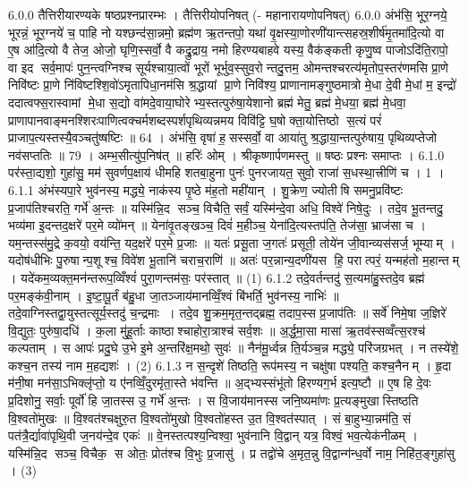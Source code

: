 \setcounter{anuvakam}{0}
6.0.0
तैत्तिरीयारण्यके षष्ठप्रश्नप्रारम्भः । तैत्तिरीयोपनिषत् (- महानारायणोपनिषत्)
6.0.0
अंभ॑सि॒ भूर॒ग्नये॒ भूरन्नं॒ भूर॒ग्नये॑ च॒ पाहि नो यश्छन्द॑सा॒न्नमो॒ ब्रह्म॑ण ऋ॒तन्तपो॒ यथा॑ वृ॒क्षस्या॒णोरणी॑यान्त्सहस्र॒शीर्\mbox{}ष॑मृ॒तमा॑दि॒त्यो वा ए॒ष आ॑दि॒त्यो वै तेज॒ ओजो॒ घृणि॒स्सर्वो॒ वै कद्रु॒द्राय॒ नमो हिरण्यबाहवे यस्य॒ वैक॑ङ्कती कृणु॒ष्व पाजोऽदि॑ति॒रापो॒ वा इद सर्व॒मापः॑ पुन॒न्त्वग्निश्च सूर्यश्चाया॒त्वों भूरों भूर्भुव॒स्सुव॒रोन्तदु॒त्तम॒ ओमन्तश्चरत्य॑मृतोप॒स्तर॑णमसि प्रा॒णे निवि॑ष्टः प्रा॒णे नि॑विष्टश्शि॒वो॑ऽमृतापिधा॒नम॑सि श्र॒द्धायां प्रा॒णे निवि॑श्य॒ प्राणानामङ्गुष्ठमात्रो मे॒धा दे॒वी मे॒धां म॒ इन्द्रो॑ ददात्वफ्स॒रास्वामां मे॒धा स॒द्यो वा॑मदे॒वाया॒घोरेभ्य॒स्तत्पुरु॑षा॒येशानो ब्रह्म॑ मेतु॒ ब्रह्म॑ मे॒धया॒ ब्रह्म॑ मे॒धवा॒ प्राणापानवाङ्मनश्शिरःपाणित्वक्चर्मशब्दस्पर्शपृथिव्यन्नमय विवि॑ट्टि घ॒षोक्ता॒योत्तिष्ठो स॒त्यं परं॑ प्राजाप॒त्यस्तस्यै॒वञ्चतु॑ष्षष्टिः ॥ 64 । अंभ॑सि॒ वृषा॑ ह॒सस्सर्वो॒ वा आया॑तु श्र॒द्धाया॒न्तत्पुरु॑षाय॒ पृथिव्यप्तेजो नव॑सप्ततिः ॥ 79 । अम्भ॒सीत्यु॑प॒निष॑त् ॥ हरिः॑ ओम् । श्रीकृष्णार्पणमस्तु ॥ षष्ठः प्रश्नः समाप्तः ।
6.1.0
पर॑स्ता॒द्यशो॒ गुहा॑सु॒ मम॑ सुवर्णप॒क्षाय॑ धीमहि शतबा॒हुना पुनः॑ पुनरजायत॒ सुवो॒ राजा॑ स॒धस्था॒त्त्रीणि॑ च । 1 ।
6.1.1
अंभ॑स्यपा॒रे भुव॑नस्य॒ मद्ध्ये॒ नाक॑स्य पृ॒ष्ठे म॑ह॒तो मही॑यान् । शु॒क्रेण॒ ज्योतीषि समनु॒प्रवि॑ष्टः प्र॒जाप॑तिश्चरति॒ गर्भे॑ अ॒न्तः ॥ यस्मि॑न्नि॒द सञ्च॒ विचैति॒ सर्वं॒ यस्मि॑न्दे॒वा अधि॒ विश्वे॑ निषे॒दुः । तदे॒व भू॒तन्तदु॒ भव्य॑मा इ॒दन्तद॒क्षरे॑ पर॒मे व्यो॑मन् ॥ येना॑वृ॒तङ्खञ्च॒ दिवं॑ म॒हीञ्च॒ येना॑दि॒त्यस्तप॑ति॒ तेज॑सा॒ भ्राज॑सा च । यम॒न्तस्स॑मु॒द्रे क॒वयो॒ वय॑न्ति॒ यद॒क्षरे॑ पर॒मे प्र॒जाः ॥ यतः॑ प्रसू॒ता ज॒गतः॑ प्रसूती॒ तोये॑न जी॒वान्व्यस॑सर्ज॒ भूम्याम् । यदोष॑धीभिः पु॒रुषान्प॒शूश्च॒ विवे॑श भू॒तानि॑ चराच॒राणि॑ ॥ अतः॑ पर॒न्नान्य॒दणी॑यस हि॒ परात्परं॒ यन्मह॑तो म॒हान्तम् । यदे॑कम॒व्यक्त॒मन॑न्तरूप॒व्विँश्वं॑ पुरा॒णन्तम॑सः॒ पर॑स्तात् ॥ (1)
6.1.2
तदे॒वर्तन्तदु॑ स॒त्यमा॑हु॒स्तदे॒व ब्रह्म॑ पर॒मङ्क॑वी॒नाम् । इ॒ष्टा॒पू॒र्तं ब॑हु॒धा जा॒तञ्जाय॑मानव्विँ॒श्वं बि॑भर्ति॒ भुव॑नस्य॒ नाभिः॑ ॥ तदे॒वाग्निस्तद्वा॒युस्तत्सूर्य॒स्तदु॑ च॒न्द्रमाः । तदे॒व शु॒क्रम॒मृत॒न्तद्ब्रह्म॒ तदाप॒स्स प्र॒जाप॑तिः ॥ सर्वे॑ निमे॒षा ज॒ज्ञिरे॑ वि॒द्युतः॒ पुरु॑षा॒दधि॑ । क॒ला मु॑हू॒र्ताः काष्ठाश्चाहोरा॒त्राश्च॑ सर्व॒शः ॥ अ॒र्द्ध॒मा॒सा मासा॑ ऋ॒तव॑स्सव्वँत्स॒रश्च॑ कल्पताम् । स आपः॑ प्रदु॒घे उ॒भे इ॒मे अ॒न्तरि॑क्ष॒मथो॒ सुवः॑ ॥ नैन॑मू॒र्ध्वन्न ति॒र्यञ्च॒न्न मद्ध्ये॒ परि॑जग्रभत् । न तस्ये॑शे॒ कश्च॒न तस्य॑ नाम म॒हद्यशः॑ । (2)
6.1.3
न स॒न्दृशे॑ तिष्ठति॒ रूप॑मस्य॒ न चक्षु॑षा पश्यति॒ कश्च॒नैनम् । हृ॒दा म॑नी॒षा मन॑सा॒ऽभिक्लृ॑प्तो॒ य ए॑नव्विँ॒दुरमृ॑ता॒स्ते भ॑वन्ति ॥ अ॒द्भ्यस्संभू॑तो हिरण्यग॒र्भ इत्य॒ष्टौ ॥ ए॒ष हि दे॒वः प्र॒दिशोनु॒ सर्वाः॒ पूर्वो॑ हि जा॒तस्स उ॒ गर्भे॑ अ॒न्तः । स वि॒जाय॑मानस्स जनि॒ष्यमा॑णः प्र॒त्यङ्मुखास्तिष्ठति वि॒श्वतो॑मुखः ॥ वि॒श्वत॑श्चक्षुरु॒त वि॒श्वतो॑मुखो वि॒श्वतो॑हस्त उ॒त वि॒श्वत॑स्पात् । सं बा॒हुभ्या॒न्नम॑ति॒ सं पत॑त्रै॒र्द्यावा॑पृथि॒वी ज॒नय॑न्दे॒व एकः॑ ॥ वे॒नस्तत्पश्य॒न्विश्वा॒ भुव॑नानि वि॒द्वान् यत्र॒ विश्वं॒ भव॒त्येक॑नीळम् । यस्मि॑न्नि॒द सञ्च॒ विचैक॒ स ओतः॒ प्रोत॑श्च वि॒भुः प्र॒जासु॑ । प्र तद्वो॑चे अ॒मृत॒न्नु वि॒द्वान्ग॑न्ध॒र्वो नाम॒ निहि॑त॒ङ्गुहा॑सु । (3)
